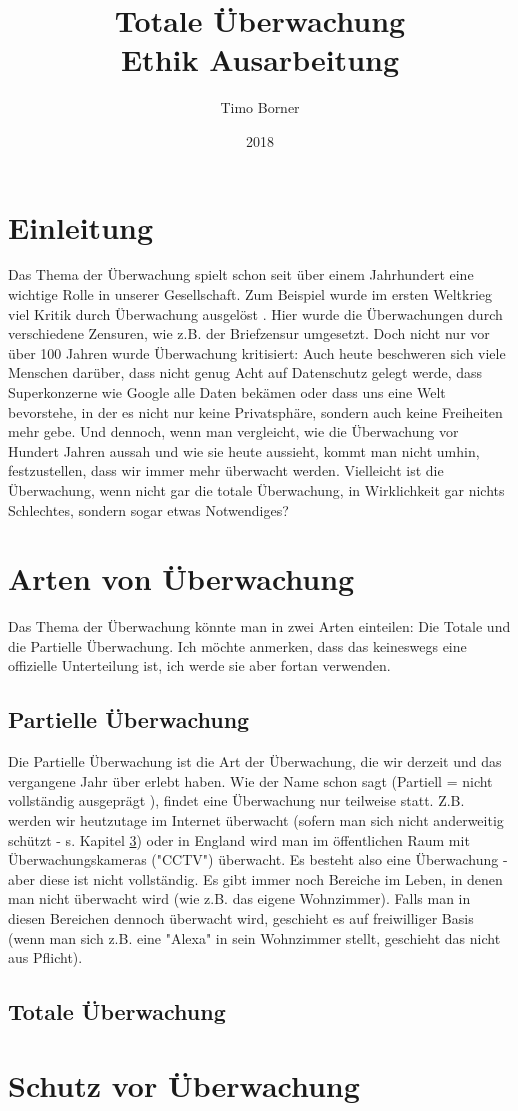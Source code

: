 \documentclass{article}
\title{Totale Überwachung \\ Ethik Ausarbeitung}
\author{Timo Borner}
\date{2018}
\begin{document}
\maketitle
\newpage

\section{Einleitung}
Das Thema der Überwachung spielt schon seit über einem Jahrhundert eine wichtige Rolle in unserer Gesellschaft. Zum Beispiel wurde im ersten Weltkrieg viel Kritik durch Überwachung ausgelöst \autocite{Pressefreiheit}.
Hier wurde die Überwachungen durch verschiedene Zensuren, wie z.B. der Briefzensur \autocite{Zensur} umgesetzt. Doch nicht nur vor über 100 Jahren wurde Überwachung kritisiert: Auch heute beschweren sich viele Menschen darüber, dass nicht genug Acht auf Datenschutz gelegt werde, dass Superkonzerne wie Google alle Daten bekämen oder dass uns eine Welt bevorstehe, in der es nicht nur keine Privatsphäre, sondern auch keine Freiheiten mehr gebe. Und dennoch, wenn man vergleicht, wie die Überwachung vor Hundert Jahren aussah und wie sie heute aussieht, kommt man nicht umhin, festzustellen, dass wir immer mehr überwacht werden. Vielleicht ist die Überwachung, wenn nicht gar die totale Überwachung, in Wirklichkeit gar nichts Schlechtes, sondern sogar etwas Notwendiges?

\section{Arten von Überwachung}
Das Thema der Überwachung könnte man in zwei Arten einteilen: Die Totale und die Partielle Überwachung. Ich möchte anmerken, dass das keineswegs eine offizielle Unterteilung ist, ich werde sie aber fortan verwenden.

\subsection{Partielle Überwachung}
Die Partielle Überwachung ist die Art der Überwachung, die wir derzeit und das vergangene Jahr über erlebt haben. Wie der Name schon sagt (Partiell = nicht vollständig ausgeprägt \autocite{Partiell}), findet eine Überwachung nur teilweise statt. Z.B. werden wir heutzutage im Internet überwacht (sofern man sich nicht anderweitig schützt - s. Kapitel \ref{sec:Schutz vor Ueberwachung}) oder in England wird man im öffentlichen Raum mit Überwachungskameras ("CCTV") überwacht. Es besteht also eine Überwachung - aber diese ist nicht vollständig. Es gibt immer noch Bereiche im Leben, in denen man nicht überwacht wird (wie z.B. das eigene Wohnzimmer). Falls man in diesen Bereichen dennoch überwacht wird, geschieht es auf freiwilliger Basis (wenn man sich z.B. eine "Alexa" in sein Wohnzimmer stellt, geschieht das nicht aus Pflicht).

\subsection{Totale Überwachung}




\section{Schutz vor Überwachung}
\label{sec:Schutz vor Ueberwachung}
\newpage
\printbibliography
\end{document}
